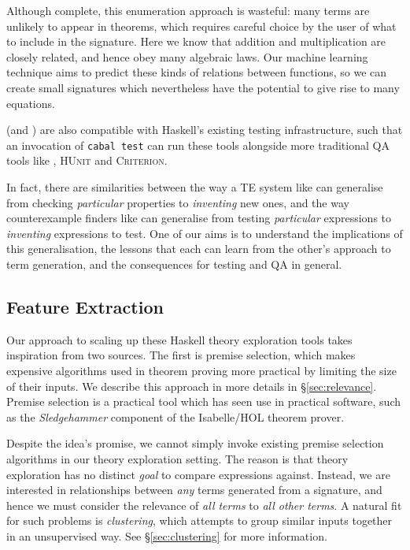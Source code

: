 Although complete, this enumeration approach is wasteful: many terms are unlikely to appear in theorems, which requires careful choice by the user of what to include in the signature. Here we know that addition and multiplication are closely related, and hence obey many algebraic laws. Our machine learning technique aims to predict these kinds of relations between functions, so we can create small signatures which nevertheless have the potential to give rise to many equations.

\qspec{} (and \hspec{}) are also compatible with Haskell's existing testing infrastructure, such that an invocation of \texttt{cabal test} can run these tools alongside more traditional QA tools like \qcheck{}, \textsc{HUnit} and \textsc{Criterion}.

In fact, there are similarities between the way a TE system like \qspec{} can generalise from checking \emph{particular} properties to \emph{inventing} new ones, and the way counterexample finders like \qcheck{} can generalise from testing \emph{particular} expressions to \emph{inventing} expressions to test. One of our aims is to understand the implications of this generalisation, the lessons that each can learn from the other's approach to term generation, and the consequences for testing and QA in general.

\subsection{Feature Extraction}
\label{sec:featureextraction}

\iffalse TODO: include definitions \fi
\iffalse TODO: make more relevant to our context \fi

Our approach to scaling up these Haskell theory exploration tools takes inspiration from two sources. The first is premise selection, which makes expensive algorithms used in theorem proving more practical by limiting the size of their inputs. We describe this approach in more details in \S \ref{sec:relevance}. Premise selection is a practical tool which has seen use in practical software, such as the \emph{Sledgehammer} component of the Isabelle/HOL theorem prover.

Despite the idea's promise, we cannot simply invoke existing premise selection algorithms in our theory exploration setting. The reason is that theory exploration has no distinct \emph{goal} \iffalse TODO: implies that premise selection has a goal; rephrase: premise selection is given a concrete formula (called the ``goal'') to compare terms against \fi to compare expressions against. Instead, we are interested in relationships between \emph{any} terms generated from a signature, and hence we must consider the relevance of \emph{all terms} to \emph{all other terms}. A natural fit for such problems is \emph{clustering}, which attempts to group similar inputs together in an unsupervised way. See \S \ref{sec:clustering} for more information.


